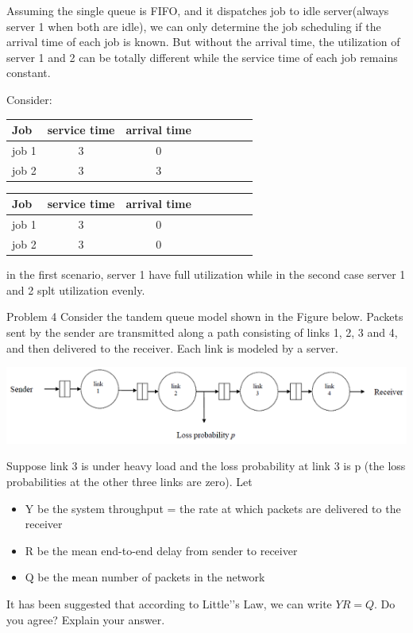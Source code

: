 \documentclass[12pt]{article}
\begin{document}
\begin{enumerate}
\begin{enumerate}
Assuming the single queue is FIFO, and it dispatches job to idle server(always server 1 when both are idle), we can only determine the job scheduling if the arrival time of each job is known. But without the arrival time, the utilization of server 1 and 2 can be totally different while the service time of each job remains constant.

Consider:

\begin{tabular}{l*{6}{c}r}
Job              & service time & arrival time \\
\hline
job 1            & 3 & 0 \\
job 2            & 3 & 3 \\
\end{tabular}

\begin{tabular}{l*{6}{c}r}
Job              & service time & arrival time \\
\hline
job 1            & 3 & 0 \\
job 2            & 3 & 0 \\
\end{tabular}

in the first scenario, server 1 have full utilization while in the second case server 1 and 2 splt utilization evenly.

\end{enumerate}
\medskip

\begin{minipage}{\textwidth}
\item{Problem 4}
Consider the tandem queue model shown in the Figure below. Packets sent by the sender are transmitted along a path consisting of links 1, 2, 3 and 4, and then delivered to the receiver. Each link is modeled by a server.

\includegraphics{a1q4.png}
\end{minipage}
Suppose link 3 is under heavy load and the loss probability at link 3 is p (the loss probabilities at the
other three links are zero). Let
\begin{itemize}
\item{} Y be the system throughput = the rate at which packets are delivered to the receiver
\item{} R be the mean end-to-end delay from sender to receiver
\item{} Q be the mean number of packets in the network
\end{itemize}
It has been suggested that according to Little'’s Law, we can write $YR = Q$. Do you agree? Explain your answer.


\end{enumerate}
\end{document}
